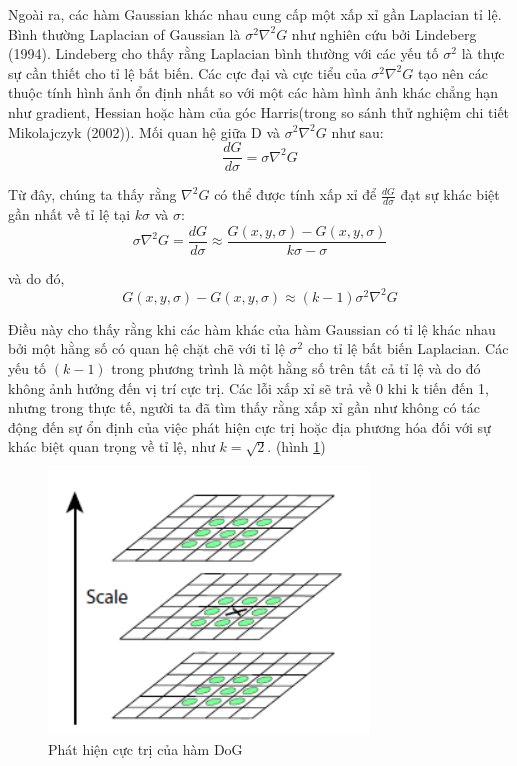 \documentclass[conference]{IEEEtran}
\begin{document}
Ngoài ra, các hàm Gaussian khác nhau cung cấp một xấp xỉ gần Laplacian tỉ lệ. Bình thường Laplacian of Gaussian là ${\sigma^2\nabla^2G}$ như nghiên cứu bởi Lindeberg (1994). Lindeberg cho thấy rằng Laplacian bình thường với các yếu tố ${\sigma^2}$ là thực sự cần thiết cho tỉ lệ bất biến. Các cực đại và cực tiểu của ${\sigma^2\nabla^2G}$ tạo nên các thuộc tính hình ảnh ổn định nhất so với một các hàm hình ảnh khác chẳng hạn như gradient, Hessian hoặc hàm của góc Harris(trong so sánh thử nghiệm chi tiết Mikolajczyk (2002)). Mối quan hệ giữa D và ${\sigma^2\nabla^2G}$ như sau:
\begin{equation}
\frac{dG}{d\sigma} = \sigma\nabla^2G
\end{equation}

Từ đây, chúng ta thấy rằng $\nabla^2G$ có thể được tính xấp xỉ để $\frac{dG}{d\sigma}$ đạt sự khác biệt gần nhất về tỉ lệ tại $k\sigma$ và $\sigma$:
\begin{equation}
\sigma\nabla^2G = \frac{dG}{d\sigma} \approx \frac{G(x,y,\sigma) - G(x,y,\sigma)}{k\sigma - \sigma}
\end{equation}

và do đó,
\begin{equation}
G(x,y,\sigma) - G(x,y,\sigma) \approx (k-1)\sigma^2\nabla^2G
\end{equation} 

Điều này cho thấy rằng khi các hàm khác của hàm Gaussian có tỉ lệ khác nhau bởi một hằng số có quan hệ chặt chẽ với tỉ lệ ${\sigma^2}$ cho tỉ lệ bất biến Laplacian. Các yếu tố ${(k-1)}$ trong phương trình là một hằng số trên tất cả tỉ lệ và do đó không ảnh hưởng đến vị trí cực trị. Các lỗi xấp xỉ sẽ trả về 0 khi k tiến đến 1, nhưng trong thực tế, người ta đã tìm thấy rằng xấp xỉ gần như không có tác động đến sự ổn định của việc phát hiện cực trị hoặc địa phương hóa đối với sự khác biệt quan trọng về tỉ lệ, như ${k=\sqrt{2}}$. (hình \ref{fig:hesok_phu})
\begin{figure}
  \includegraphics[width=\linewidth]{hesok_phu}
  \caption{Phát hiện cực trị của hàm DoG}
  \label{fig:hesok_phu}
\end{figure}
\end{document}

